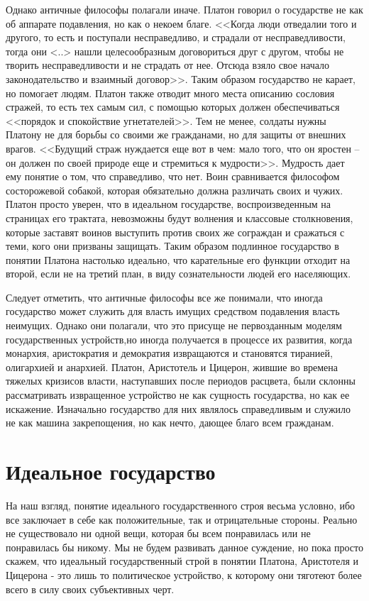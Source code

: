 	Однако античные философы полагали иначе. Платон говорил о государстве 
	не как об аппарате подавления, но как о некоем благе. <<Когда люди 
	отведалии того и другого, то есть и поступали несправедливо, и 
	страдали от несправедливости, тогда они <..> нашли целесообразным 
	договориться друг с другом, чтобы не творить несправедливости и не 
	страдать от нее. Отсюда взяло свое начало законодательство и взаимный 
	договор>>. Таким образом государство не карает, но помогает людям. 
	Платон также отводит много места описанию сословия стражей, то есть 
	тех самым сил, с помощью которых должен обеспечиваться <<порядок и 
	спокойствие угнетателей>>. Тем не менее, солдаты нужны Платону не для 
	борьбы со своими же гражданами, но для защиты от внешних врагов. 
	<<Будущий страж нуждается еще вот в чем: мало того, что он яростен -- 
	он должен по своей природе еще и стремиться к мудрости>>. Мудрость дает 
	ему понятие о том, что справедливо, что нет. Воин сравнивается философом 
	состорожевой собакой, которая обязательно должна различать своих и чужих. 
	Платон просто уверен, что в идеальном государстве, воспроизведенным на 
	страницах его трактата, невозможны будут волнения и классовые 
	столкновения, которые заставят воинов выступить против своих же сограждан 
	и сражаться с теми, кого они призваны защищать. Таким образом подлинное 
	государство в понятии Платона настолько идеально, что карательные его 
	функции отходит на второй, если не на третий план, в виду сознательности 
	людей его населяющих.

	Следует отметить, что античные философы все же понимали, что иногда 
	государство может служить для власть имущих средством подавления власть 
	неимущих. Однако они полагали, что это присуще не первозданным моделям 
	государственных устройств,но иногда получается в процессе их развития, 
	когда монархия, аристократия и демократия извращаются и становятся 
	тиранией, олигархией и анархией. Платон, Аристотель и Цицерон, жившие 
	во времена тяжелых кризисов власти, наступавших после периодов расцвета, 
	были склонны рассматривать извращенное устройство не как сущность 
	государства, но как ее искажение. Изначально государство для них являлось 
	справедливым и служило не как машина закрепощения, но как нечто, дающее 
	благо всем гражданам.

\chapter{Идеальное государство}
	На наш взгляд, понятие идеального государственного строя весьма условно, 
	ибо все заключает в себе как положительные, так и отрицательные стороны. 
	Реально не существовало ни одной вещи, которая бы всем понравилась или не 
	понравилась бы никому. Мы не будем развивать данное суждение, но пока 
	просто скажем, что идеальный государственный строй в понятии Платона, 
	Аристотеля и Цицерона - это лишь то политическое устройство, к которому 
	они тяготеют более всего в силу своих субъективных черт.

